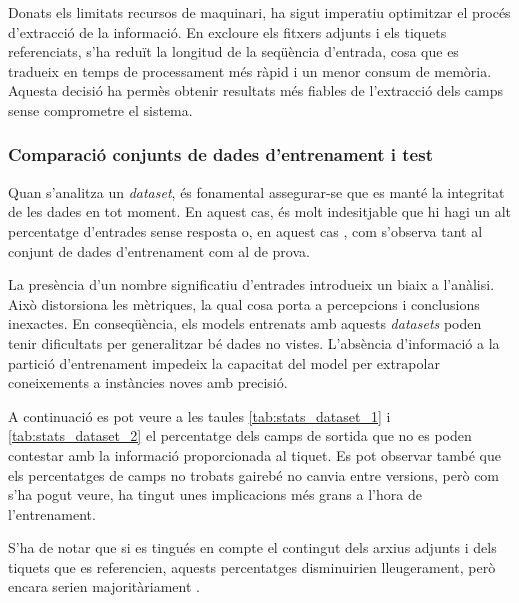 Donats els limitats recursos de maquinari, ha sigut imperatiu optimitzar el procés d'extracció de la informació. En excloure els fitxers adjunts i els tiquets referenciats, s'ha reduït la longitud de la seqüència d'entrada, cosa que es tradueix en temps de processament més ràpid i un menor consum de memòria. Aquesta decisió ha permès obtenir resultats més fiables de l'extracció dels camps sense comprometre el sistema.

\subsubsection{Comparació conjunts de dades d'entrenament i test}
Quan s'analitza un \textit{dataset}, és fonamental assegurar-se que es manté la integritat de les dades en tot moment. En aquest cas, és molt indesitjable que hi hagi un alt percentatge d'entrades sense resposta o, en aquest cas , com s'observa tant al conjunt de dades d'entrenament com al de prova.

La presència d'un nombre significatiu d'entrades  introdueix un biaix a l'anàlisi. Això distorsiona les mètriques, la qual cosa porta a percepcions i conclusions inexactes. En conseqüència, els models entrenats amb aquests \textit{datasets} poden tenir dificultats per generalitzar bé dades no vistes. L'absència d'informació a la partició d'entrenament impedeix la capacitat del model per extrapolar coneixements a instàncies noves amb precisió.

A continuació es pot veure a les taules \ref{tab:stats_dataset_1} i \ref{tab:stats_dataset_2} el percentatge dels camps de sortida que no es poden contestar amb la informació proporcionada al tiquet. Es pot observar també que els percentatges de camps no trobats gairebé no canvia entre versions, però com s'ha pogut veure, ha tingut unes implicacions més grans a l'hora de l'entrenament.

S'ha de notar que si es tingués en compte el contingut dels arxius adjunts i dels tiquets que es referencien, aquests percentatges disminuirien lleugerament, però encara serien majoritàriament .

